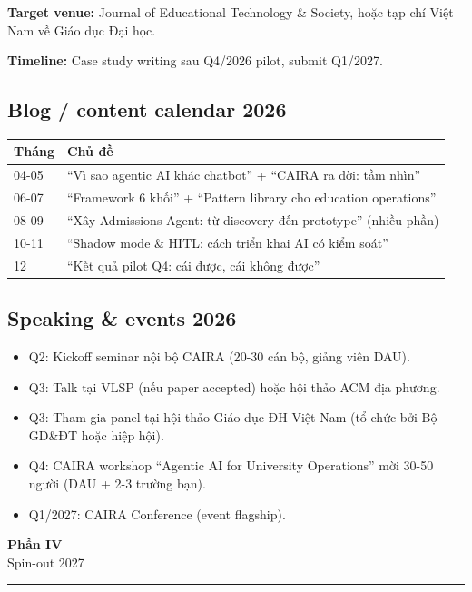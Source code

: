 \documentclass[11pt,a4paper]{article}
\begin{document}
\textbf{Target venue:} Journal of Educational Technology \& Society, hoặc
tạp chí Việt Nam về Giáo dục Đại học.

\textbf{Timeline:} Case study writing sau Q4/2026 pilot, submit Q1/2027.

\subsection{Blog / content calendar 2026}

\begin{tabularx}{\linewidth}{@{}p{2cm} X@{}}
\toprule
\textbf{Tháng} & \textbf{Chủ đề} \\
\midrule
04-05 & ``Vì sao agentic AI khác chatbot'' + ``CAIRA ra đời: tầm nhìn'' \\
06-07 & ``Framework 6 khối'' + ``Pattern library cho education operations'' \\
08-09 & ``Xây Admissions Agent: từ discovery đến prototype'' (nhiều phần) \\
10-11 & ``Shadow mode \& HITL: cách triển khai AI có kiểm soát'' \\
12 & ``Kết quả pilot Q4: cái được, cái không được'' \\
\bottomrule
\end{tabularx}

\subsection{Speaking \& events 2026}

\begin{itemize}
\item Q2: Kickoff seminar nội bộ CAIRA (20-30 cán bộ, giảng viên DAU).
\item Q3: Talk tại VLSP (nếu paper accepted) hoặc hội thảo ACM địa phương.
\item Q3: Tham gia panel tại hội thảo Giáo dục ĐH Việt Nam (tổ chức bởi Bộ GD\&ĐT hoặc hiệp hội).
\item Q4: CAIRA workshop ``Agentic AI for University Operations'' mời 30-50 người (DAU + 2-3 trường bạn).
\item Q1/2027: CAIRA Conference (event flagship).
\end{itemize}

\clearpage

\begin{center}
\vspace*{0.5em}
{\sffamily\bfseries\Huge\color{spinout} Phần IV}\\[0.5em]
{\sffamily\LARGE\color{mid} Spin-out 2027}\\[0.5em]
{\color{spinout}\rule{6cm}{0.4pt}}
\end{center}
\vspace{1em}
\end{document}
